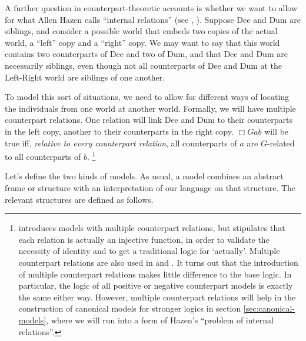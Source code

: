 \documentclass[11pt]{woarticle}
\theoremstyle{break}
\theoremstyle{nonumberplain}
\newcommand{\1}{\;\,|\;\,}
\begin{document}
A further question in counterpart-theoretic accounts is whether we want to allow
for what Allen Hazen calls ``internal relations'' (see
\cite[328--330]{hazen79counterpart}, \cite[232f.]{plurality}). Suppose Dee and
Dum are siblings, and consider a possible world that embeds two copies of the
actual world, a ``left'' copy and a ``right'' copy. We may want to say that this
world contains two counterparts of Dee and two of Dum, and that Dee and Dum are
necessarily siblings, even though not all counterparts of Dee and Dum at the
Left-Right world are siblings of one another.

To model this sort of situations, we need to allow for different ways of
locating the individuals from one world at another world. Formally, we will have
multiple counterpart relations. One relation will link Dee and Dum to their
counterparts in the left copy, another to their counterparts in the right copy.
$\Box Gab$ will be true iff, \emph{relative to every counterpart relation}, all
counterparts of $a$ are $G$-related to all counterparts of $b$.%
\footnote{\label{fn-multicr}%
  \cite{hazen79counterpart} introduces models with multiple counterpart
  relations, but stipulates that each relation is actually an injective
  function, in order to validate the necessity of identity and to get a
  traditional logic for `actually'. Multiple counterpart relations are also used
  in \cite{kutz00kripke} and \cite{kracht02semantics}. It turns out that the
  introduction of multiple counterpart relations makes little difference to the
  base logic. In particular, the logic of all positive or negative counterpart
  models is exactly the same either way. However, multiple counterpart relations
  will help in the construction of canonical models for stronger logics in
  section \ref{sec:canonical-models}, where we will run into a form of Hazen's ``problem of
  internal relations''.%
} %

Let's define the two kinds of models. As usual, a model combines an abstract
frame or structure with an interpretation of our language on that structure. The
relevant structures are defined as follows.
\end{document}
